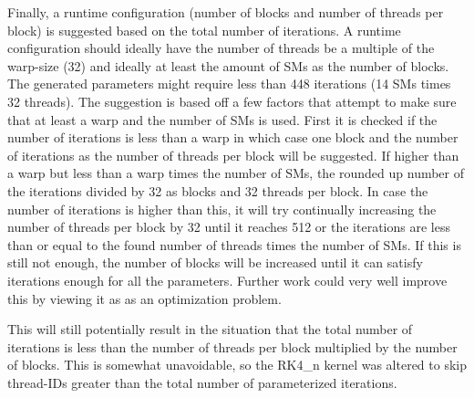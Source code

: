 Finally, a runtime configuration (number of blocks and number of threads per block) is suggested based on the total number of iterations.
A runtime configuration should ideally have the number of threads be a multiple of the warp-size (32) and ideally at least the amount of SMs as the number of blocks.
The generated parameters might require less than 448 iterations (14 SMs times 32 threads).
The suggestion is based off a few factors that attempt to make sure that at least a warp and the number of SMs is used.
First it is checked if the number of iterations is less than a warp in which case one block and the number of iterations as the number of threads per block will be suggested.
If higher than a warp but less than a warp times the number of SMs, the rounded up number of the iterations divided by 32 as blocks and 32 threads per block.
In case the number of iterations is higher than this, it will try continually increasing the number of threads per block by 32 until it reaches 512 or the iterations are less than or equal to the found number of threads times the number of SMs.
If this is still not enough, the number of blocks will be increased until it can satisfy iterations enough for all the parameters.
Further work could very well improve this by viewing it as as an optimization problem.

This will still potentially result in the situation that the total number of iterations is less than the number of threads per block multiplied by the number of blocks.
This is somewhat unavoidable, so the RK4\_n kernel was altered to skip thread-IDs greater than the total number of parameterized iterations.
